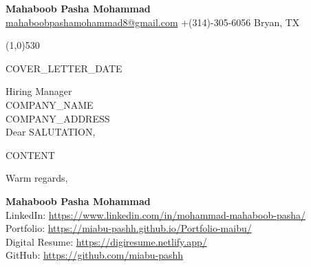 \documentclass[11pt,letterpaper]{article}
\begin{document}
\begin{center}
{\Large \textbf{Mahaboob Pasha Mohammad}}\\[0.5em]
\href{mailto:mahaboobpashamohammad8@gmail.com}{mahaboobpashamohammad8@gmail.com} \textbar{} +(314)-305-6056 \textbar{}  Bryan, TX
\end{center}
\vspace{-1.5em}
\line(1,0){530}

\vspace{1em}

{{COVER_LETTER_DATE}}

Hiring Manager\\
{{COMPANY_NAME}}\\
{{COMPANY_ADDRESS}}\\

Dear {{SALUTATION}},

{{CONTENT}}

\vspace{12pt}

Warm regards,

\textbf{Mahaboob Pasha Mohammad}\\
LinkedIn: \href{https://www.linkedin.com/in/mohammad-mahaboob-pasha/}{https://www.linkedin.com/in/mohammad-mahaboob-pasha/}\\
Portfolio: \href{https://miabu-pashh.github.io/Portfolio-maibu/}{https://miabu-pashh.github.io/Portfolio-maibu/}\\
Digital Resume: \href{https://digiresume.netlify.app/}{https://digiresume.netlify.app/}\\
GitHub: \href{https://github.com/miabu-pashh}{https://github.com/miabu-pashh}
\end{document}
